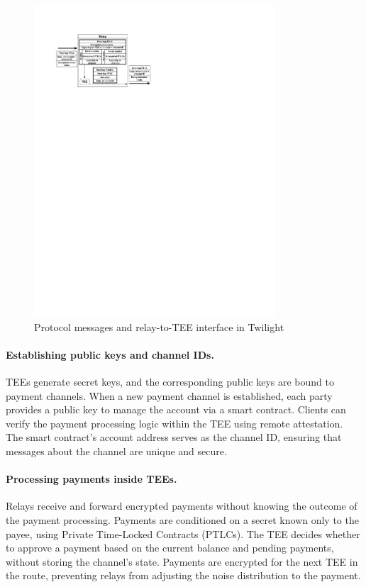 \documentclass[lang=en]{sjtuarticle}
\begin{document}
\begin{figure}[h]
    \centering
    \includegraphics[width=0.8\textwidth]{twilight.pdf}
    \caption{Protocol messages and relay-to-TEE interface in Twilight}
    \label{fig:twilight}
\end{figure}

\paragraph{Establishing public keys and channel IDs.}

TEEs generate secret keys, and the corresponding public keys are bound to payment channels.
When a new payment channel is established, each party provides a public key to manage the account via a smart contract.
Clients can verify the payment processing logic within the TEE using remote attestation.
The smart contract's account address serves as the channel ID, ensuring that messages about the channel are unique and secure.

\paragraph{Processing payments inside TEEs.}

Relays receive and forward encrypted payments without knowing the outcome of the payment processing.
Payments are conditioned on a secret known only to the payee, using Private Time-Locked Contracts (PTLCs).
The TEE decides whether to approve a payment based on the current balance and pending payments, without storing the channel's state.
Payments are encrypted for the next TEE in the route, preventing relays from adjusting the noise distribution to the payment.
\end{document}
